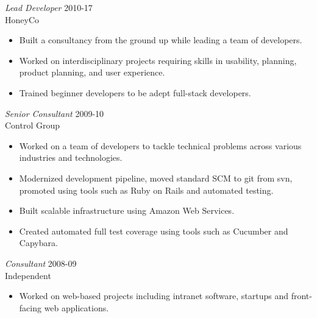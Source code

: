 \documentclass[line,margin]{res}
\begin{document}
\begin{resume}
    {\sl Lead Developer}
    \hfill 2010-17 \\
    HoneyCo
    \begin{itemize} \itemsep -2pt
        \item
            Built a consultancy from the ground up while leading
            a team of developers.

        \item
            Worked on interdisciplinary projects requiring skills in
            usability, planning, product planning, and user experience.

        \item
            Trained beginner developers to be adept full-stack developers.

    \end{itemize}

    {\sl Senior Consultant}
    \hfill 2009-10 \\
    Control Group
    \begin{itemize} \itemsep -2pt
        \item
            Worked on a team of developers to tackle technical problems across
            various industries and technologies.

        \item
            Modernized development pipeline, moved standard SCM to git from
            svn, promoted using tools such as Ruby on Rails and automated
            testing.

        \item
            Built scalable infrastructure using Amazon Web Services.

        \item
            Created automated full test coverage using tools such as Cucumber
            and Capybara.

    \end{itemize}

    \begin{samepage}
    {\sl Consultant}
    \hfill 2008-09 \\
    Independent
    \begin{itemize} \itemsep -2pt
        \item
            Worked on web-based projects including intranet software, startups
            and front-facing web applications.

    \end{itemize}
    \end{samepage}


\end{resume}
\end{document}

